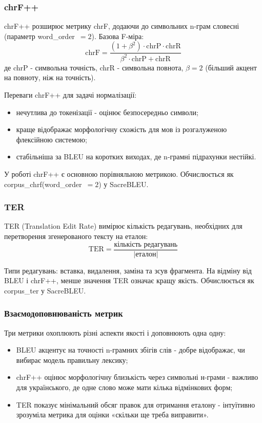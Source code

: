 \documentclass[14pt]{extarticle}
\begin{document}
\subsubsection{chrF++}

chrF++ розширює метрику chrF, додаючи до символьних n-грам словесні (параметр word\_order~$= 2$). Базова F-міра:
\begin{equation}
  \text{chrF} = \frac{(1+\beta^2) \cdot \text{chrP} \cdot \text{chrR}}{\beta^2 \cdot \text{chrP} + \text{chrR}}
  \label{eq:chrf}
\end{equation}
де chrP - символьна точність, chrR - символьна повнота, $\beta = 2$ (більший акцент на повноту, ніж на точність).

Переваги chrF++ для задачі нормалізації:
\begin{itemize}
  \item нечутлива до токенізації - оцінює безпосередньо символи;
  \item краще відображає морфологічну схожість для мов із розгалуженою флексійною системою;
  \item стабільніша за BLEU на коротких виходах, де n-грамні підрахунки нестійкі.
\end{itemize}

У роботі chrF++ є основною порівняльною метрикою. Обчислюється як corpus\_chrf(word\_order~$= 2$) у SacreBLEU.

\subsubsection{TER}

TER (Translation Edit Rate) вимірює кількість редагувань, необхідних для перетворення згенерованого тексту на еталон:
\begin{equation}
  \text{TER} = \frac{\text{кількість редагувань}}{|\text{еталон}|}
  \label{eq:ter}
\end{equation}

Типи редагувань: вставка, видалення, заміна та зсув фрагмента. На відміну від BLEU і chrF++, менше значення TER означає кращу якість. Обчислюється як corpus\_ter у SacreBLEU.

\subsubsection{Взаємодоповнюваність метрик}

Три метрики охоплюють різні аспекти якості і доповнюють одна одну:
\begin{itemize}
  \item BLEU акцентує на точності n-грамних збігів слів - добре відображає, чи вибирає модель правильну лексику;
  \item chrF++ оцінює морфологічну близькість через символьні н-грами - важливо для українського, де одне слово може мати кілька відмінкових форм;
  \item TER показує мінімальний обсяг правок для отримання еталону - інтуїтивно зрозуміла метрика для оцінки «скільки ще треба виправити».
\end{itemize}
\end{document}
